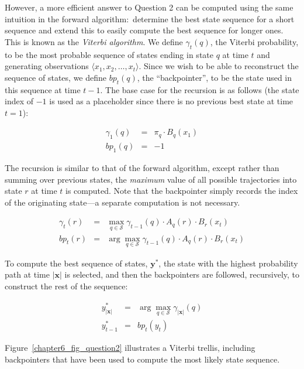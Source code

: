 However, a more efficient answer to Question 2 can be computed using
the same intuition in the forward algorithm:\ determine the best state
sequence for a short sequence and extend this to easily compute the
best sequence for longer ones.  This is known as the \emph{Viterbi
  algorithm}.  We define $\gamma_t(q)$, the Viterbi probability, to be
the most probable sequence of states ending in state $q$ at time $t$
and generating observations $\langle x_1, x_2, \ldots , x_t \rangle$.
Since we wish to be able to reconstruct the sequence of states, we
define $bp_t(q)$, the ``backpointer'', to be the state used in this
sequence at time $t-1$.  The base case for the recursion is as follows
(the state index of $-1$ is used as a placeholder since there is no
previous best state at time $t=1$):

\begin{eqnarray*}
\gamma_1(q) &=& \pi_q \cdot B_q(x_1) \\
bp_1(q) & = & -1
\end{eqnarray*}

\noindent The recursion is similar to that of the forward algorithm,
except rather than summing over previous states, the \emph{maximum}
value of all possible trajectories into state $r$ at time $t$ is
computed.  Note that the backpointer simply records the index of the
originating state---a separate computation is not necessary.

\begin{eqnarray*}
\gamma_t(r) & = & \max_{q \in \mathcal{S}}  \gamma_{t-1}(q)  \cdot A_q(r) \cdot B_r(x_t)  \\
bp_t(r) & = & \arg \max_{q \in \mathcal{S}} \gamma_{t-1}(q)  \cdot A_q(r) \cdot B_r(x_t)
\end{eqnarray*}

\noindent To compute the best sequence of states, $\textbf{y}^*$, the
state with the highest probability path at time $|\textbf{x}|$ is
selected, and then the backpointers are followed, recursively, to
construct the rest of the sequence:

\begin{eqnarray*}
y_{|\textbf{x}|}^*& =& \arg \max_{q \in \mathcal{S}} \gamma_{|\textbf{x}|}(q)\\
y_{t-1}^* &=& bp_t(y_t)
\end{eqnarray*}

\noindent Figure~\ref{chapter6_fig_question2} illustrates a Viterbi
trellis, including backpointers that have been used to compute the
most likely state sequence.

